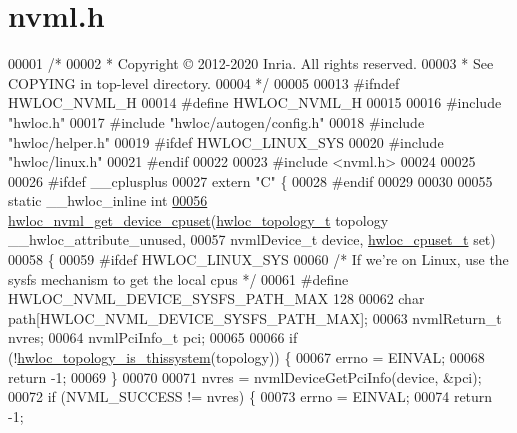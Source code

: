 \hypertarget{a00158_source}{}\section{nvml.\+h}
\label{a00158_source}

\begin{DoxyCode}
00001 \textcolor{comment}{/*}
00002 \textcolor{comment}{ * Copyright © 2012-2020 Inria.  All rights reserved.}
00003 \textcolor{comment}{ * See COPYING in top-level directory.}
00004 \textcolor{comment}{ */}
00005 
00013 \textcolor{preprocessor}{#ifndef HWLOC\_NVML\_H}
00014 \textcolor{preprocessor}{#define HWLOC\_NVML\_H}
00015 
00016 \textcolor{preprocessor}{#include "hwloc.h"}
00017 \textcolor{preprocessor}{#include "hwloc/autogen/config.h"}
00018 \textcolor{preprocessor}{#include "hwloc/helper.h"}
00019 \textcolor{preprocessor}{#ifdef HWLOC\_LINUX\_SYS}
00020 \textcolor{preprocessor}{#include "hwloc/linux.h"}
00021 \textcolor{preprocessor}{#endif}
00022 
00023 \textcolor{preprocessor}{#include <nvml.h>}
00024 
00025 
00026 \textcolor{preprocessor}{#ifdef \_\_cplusplus}
00027 \textcolor{keyword}{extern} \textcolor{stringliteral}{"C"} \{
00028 \textcolor{preprocessor}{#endif}
00029 
00030 
00055 \textcolor{keyword}{static} \_\_hwloc\_inline \textcolor{keywordtype}{int}
\hyperlink{a00221_ga26cf0036d09ec4d7cb692380fac9659d}{00056} \hyperlink{a00221_ga26cf0036d09ec4d7cb692380fac9659d}{hwloc\_nvml\_get\_device\_cpuset}(\hyperlink{a00186_ga9d1e76ee15a7dee158b786c30b6a6e38}{hwloc\_topology\_t} topology 
      \_\_hwloc\_attribute\_unused,
00057                              nvmlDevice\_t device, \hyperlink{a00183_ga4bbf39b68b6f568fb92739e7c0ea7801}{hwloc\_cpuset\_t} \textcolor{keyword}{set})
00058 \{
00059 \textcolor{preprocessor}{#ifdef HWLOC\_LINUX\_SYS}
00060   \textcolor{comment}{/* If we're on Linux, use the sysfs mechanism to get the local cpus */}
00061 \textcolor{preprocessor}{#define HWLOC\_NVML\_DEVICE\_SYSFS\_PATH\_MAX 128}
00062   \textcolor{keywordtype}{char} path[HWLOC\_NVML\_DEVICE\_SYSFS\_PATH\_MAX];
00063   nvmlReturn\_t nvres;
00064   nvmlPciInfo\_t pci;
00065 
00066   \textcolor{keywordflow}{if} (!\hyperlink{a00193_ga68ffdcfd9175cdf40709801092f18017}{hwloc\_topology\_is\_thissystem}(topology)) \{
00067     errno = EINVAL;
00068     \textcolor{keywordflow}{return} -1;
00069   \}
00070 
00071   nvres = nvmlDeviceGetPciInfo(device, &pci);
00072   \textcolor{keywordflow}{if} (NVML\_SUCCESS != nvres) \{
00073     errno = EINVAL;
00074     \textcolor{keywordflow}{return} -1;

\end{DoxyCode}
